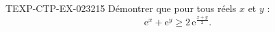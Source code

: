 \begin{exercice}{TEXP-CTP-EX-023}{2}{15}
Démontrer que pour tous réels $x$ et $y$ :
\[ \mathrm{e}^x + \mathrm{e}^y \geq 2\,\mathrm{e}^{\frac{x+y}{2}}. \]

\end{exercice}
